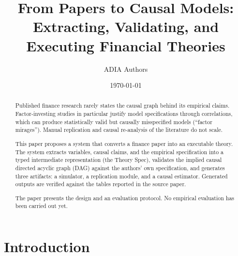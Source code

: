 


  \title{From Papers to Causal Models: Extracting, Validating, and
    Executing Financial Theories}

  \author{ADIA Authors}
  \address{\textless{}Department\textgreater{},
    \textless{}Organization\textgreater{},
    \textless{}City, State/Country\textgreater{}}


  \date{\today}

  \begin{abstract}
    Published finance research rarely states the causal graph behind its
    empirical claims. Factor-investing studies in particular justify model
    specifications through correlations, which can produce statistically
    valid but causally misspecified models (``factor mirages''). Manual
    replication and causal re-analysis of the literature do not scale.

    This paper proposes a system that converts a finance paper into an
    executable theory. The system extracts variables, causal claims, and the
    empirical specification into a typed intermediate representation (the
    Theory Spec), validates the implied causal directed acyclic graph (DAG)
    against the authors' own specification, and generates three artifacts: a
    simulator, a replication module, and a causal estimator. Generated
    outputs are verified against the tables reported in the source paper.

    The paper presents the design and an evaluation protocol. No empirical
    evaluation has been carried out yet.
  \end{abstract}

  \maketitle

  \setcounter{tocdepth}{2}
  \tableofcontents


  \section{Introduction}\label{sec:introduction}

